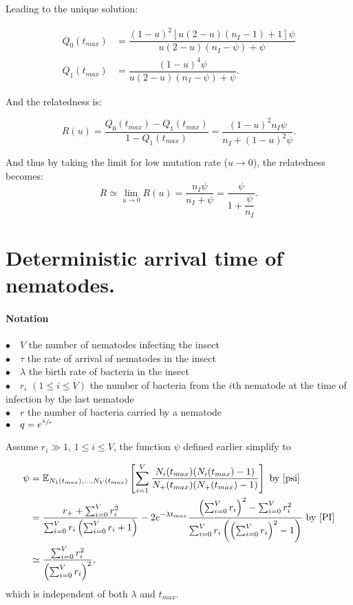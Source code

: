 \documentclass{article}
\begin{document}
 Leading to the unique solution:
 
 \begin{align}
 Q_0(t_{max}) &= \dfrac{ (1-u)^2 [u (2 - u)(n_{I}-1) +1 ]\psi }{ u (2-u )(n_{I} - \psi )+\psi }\\
 Q_1(t_{max}) &= \dfrac{(1- u )^4 \psi}{u (2-u) (n_{I} - \psi ) +\psi}.
 \end{align}

 And the relatedness is: 
 
 \begin{equation}
 R(u)=\dfrac{Q_0(t_{max})-Q_1(t_{max})}{1-Q_1(t_{max})}=\dfrac{(1-u)^2 n_{I} \psi}{n_{I} +(1-u)^2 \psi}.
 \end{equation}
 
And thus by taking the limit for low mutation rate ($u \rightarrow 0$), the relatedness becomes:
 \begin{equation}
 R \simeq \lim_{u \to 0} R(u)=\dfrac{n_{I} \psi}{n_{I} + \psi}=\dfrac{\psi}{1+ \dfrac{\psi}{n_{I}}}. \label{R=psi(nI)}
 \end{equation}
 
 \section{Deterministic arrival time of nematodes.}
 
 \paragraph{Notation} $ $\\
 $\bullet \quad V$ the number of nematodes infecting the insect\\
 $\bullet \quad \tau$ the rate of arrival of nematodes in the insect\\
 $\bullet \quad \lambda$ the birth rate of bacteria in the insect\\
 $\bullet \quad r_i$ $( 1 \leq i \leq V )$ the number of bacteria from the $i$th nematode at the time of infection by the last nematode\\
 $\bullet \quad r$ the number of bacteria carried by a nematode \\
 $\bullet \quad q=e^{\sfrac{ \lambda}{\tau}}$
 

 Assume $r_i \gg 1$, $ 1 \leq i \leq V $, the function $\psi$ defined earlier simplify to 
 
 \begin{align}
 \psi &={\mathbb E}_{N_1(t_{max}), \hdots, N_V(t_{max}) } \left[ \displaystyle  \sum_{i=1}^V \dfrac{ N_i(t_{max})(N_i(t_{max})-1)}{ N_+(t_{max})( N_+(t_{max}) -1 )} \right] \text{ by } \ref{psi} \\
 &= \dfrac{ r_+ + \sum_{i=0}^V r_i^2}{\sum_{i=0}^V r_i \left(\sum_{i=0}^V r_i +1\right) }  -2 e^{-\lambda t_{max}} \dfrac{ \left(\sum_{i=0}^V r_i\right)^2-\sum_{i=0}^V r_i^2}{\sum_{i=0}^V r_i \left( \left(\sum_{i=0}^V r_i\right)^2 -1\right) } \text{ by }\ref{PI} \\
 & \simeq \dfrac{ \sum_{i=0}^V r_i^2}{\left(\sum_{i=0}^V r_i\right)^2}, \label{simplify:relatedness}
 \end{align}
 which is independent of both $\lambda$ and $t_{max}$.
 
\end{document}
